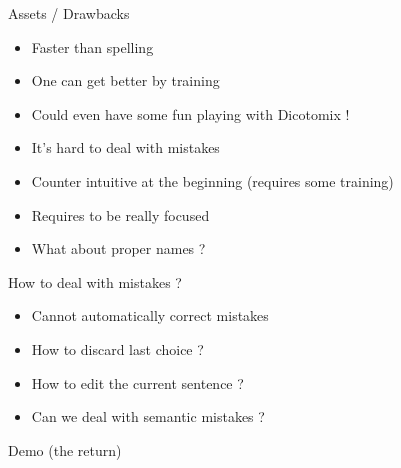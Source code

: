 \documentclass[graphics]{beamer}
\begin{document}
\begin{frame}{Assets / Drawbacks}
	\begin{tcolorbox}[colback=green!5,colframe=green!40!black,title=Assets]
		\begin{itemize}
			\item Faster than spelling
			\item One can get better by training
			\item Could even have some fun playing with Dicotomix !
		\end{itemize}
	\end{tcolorbox}
	\pause
	\begin{tcolorbox}[colback=red!5,colframe=red!40!black,title=Drawbacks]
		\begin{itemize}
			\item It's hard to deal with mistakes
			\item Counter intuitive at the beginning (requires some training)
			\item Requires to be really focused
			\item What about proper names ?
		\end{itemize}
	\end{tcolorbox}
\end{frame}

\begin{frame}{How to deal with mistakes ?}
	\begin{itemize}
		\item Cannot automatically correct mistakes
		\pause
		\item How to discard last choice ?
		\pause
		\item How to edit the current sentence ?
		\pause
		\item Can we deal with semantic mistakes ?
	\end{itemize}
\end{frame}

\begin{frame}{Demo (the return)}
\end{frame}
\end{document}
